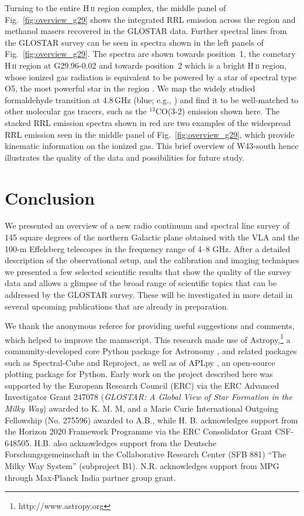 \documentclass{aa}
\DeclareRobustCommand{\ion}[2]{\textup{#1\,\textsc{\lowercase{#2}}}}
\begin{document}
Turning to the entire \ion{H}{ii} region complex, the middle panel of Fig.~\ref{fig:overview_g29} shows the integrated RRL emission across the region and methanol masers recovered in the GLOSTAR data. Further spectral lines from the GLOSTAR survey can be seen in spectra shown in the left panels of  Fig.~\ref{fig:overview_g29}. The spectra are shown towards position~1, the cometary \ion{H}{ii} region at G29.96-0.02 and towards position~2 which is a bright \ion{H}{ii} region, whose ionized gas radiation is equivalent to be powered by a star of spectral type O5, the most powerful star in the region \citep{BeltranOlmi:2013aa}. We map the widely studied formaldehyde transition at 4.8\,GHz (blue; e.g., \citealt{Wilson:1972aa}) and find it to be well-matched to other molecular gas tracers, such as the \mbox{${}^{13}$CO(3-2)} emission shown here. The stacked RRL emission spectra shown in red are two examples of the widespread RRL emission seen in the middle panel of Fig.~\ref{fig:overview_g29}, which provide kinematic information on the ionized gas. This brief overview of W43-south hence illustrates the quality of the data and possibilities for future study.


\section{Conclusion}
We presented an overview of a new radio continuum and spectral line survey of 145 square degrees of the northern Galactic plane obtained with the VLA and the 100-m Effelsberg telescopes in the frequency range of 4--8 GHz. After a detailed description of the observational setup, and the calibration and imaging techniques we presented a few selected scientific results that show the quality of the survey data and allows a glimpse of the broad range of scientific topics that can be addressed by the GLOSTAR survey. These will be investigated in more detail in several upcoming publications that are already in preparation.

\begin{acknowledgements}
We thank the anonymous referee for providing useful suggestions and comments, which helped to improve the manuscript. This research made use of Astropy,\footnote{http://www.astropy.org} a community-developed core Python package for Astronomy \citep{Astropy-CollaborationRobitaille:2013ab,Astropy-CollaborationPrice-Whelan:2018aa}, and related packages such as Spectral-Cube and Reproject, as well as of APLpy \citep{RobitailleBressert:2012aa}, an open-source plotting package for Python. Early work on the project described here was supported by the European Research Council (ERC) via the ERC Advanced Investigator Grant 247078 (\textit{GLOSTAR: A Global View of Star Formation in the Milky Way}) awarded to K. M. M, and a Marie Curie International Outgoing Fellowship (No. 275596) awarded to A.B., while H. B. acknowledges support from the Horizon 2020 Framework Programme via the ERC Consolidator Grant CSF-648505. H.B. also acknowledges support from the Deutsche Forschungsgemeinschaft in the Collaborative Research Center (SFB 881) “The Milky Way System” (subproject B1).
N.R. acknowledges support from MPG through Max-Planck India partner group grant.
\end{acknowledgements}


\end{document}
